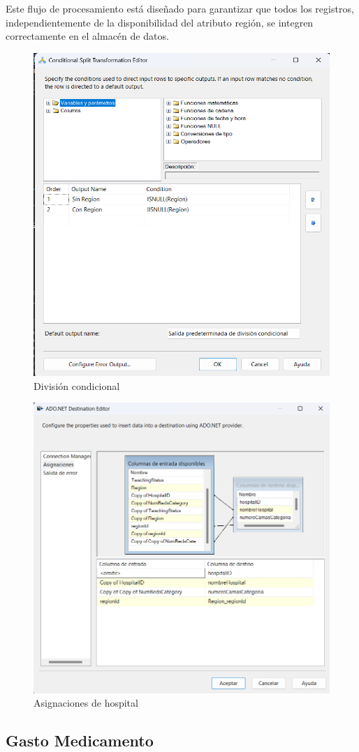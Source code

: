 \documentclass{article}
\begin{document}
	Este flujo de procesamiento está diseñado para garantizar que todos los registros, independientemente de la disponibilidad del atributo región, se integren correctamente en el almacén de datos. 
	\begin{figure}[H]
		\centering
		\includegraphics[width=.7\linewidth]{./images/tutorial/division_condicional_hospital_region_null.png}
		\caption{División condicional}
		\label{fig:division_hospital}
	\end{figure}
		\begin{figure}[H]
		\centering
		\includegraphics[width=.7\linewidth]{./images/asignaciones/hospital.png}
		\caption{Asignaciones de hospital}
	\end{figure}
	
	\subsection{Gasto Medicamento}
	
\end{document}
